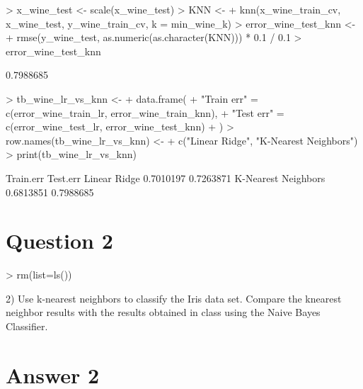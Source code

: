 \documentclass{article}
\begin{document}
\begin{Schunk}
\begin{Sinput}
> x_wine_test <- scale(x_wine_test)
> KNN <-
+   knn(x_wine_train_cv, x_wine_test, y_wine_train_cv, k = min_wine_k)
> error_wine_test_knn <-
+   rmse(y_wine_test, as.numeric(as.character(KNN))) * 0.1 / 0.1
> error_wine_test_knn 
\end{Sinput}
\begin{Soutput}
[1] 0.7988685
\end{Soutput}
\begin{Sinput}
> tb_wine_lr_vs_knn <-
+   data.frame(
+     "Train err" = c(error_wine_train_lr, error_wine_train_knn),
+     "Test err" = c(error_wine_test_lr, error_wine_test_knn)
+   )
> row.names(tb_wine_lr_vs_knn) <-
+   c("Linear Ridge", "K-Nearest Neighbors")
> print(tb_wine_lr_vs_knn)
\end{Sinput}
\begin{Soutput}
                    Train.err  Test.err
Linear Ridge        0.7010197 0.7263871
K-Nearest Neighbors 0.6813851 0.7988685
\end{Soutput}
\end{Schunk}

\section*{Question 2}

\begin{Schunk}
\begin{Sinput}
> rm(list=ls())
\end{Sinput}
\end{Schunk}

2) Use k-nearest neighbors to classify the Iris data set. 
Compare the knearest neighbor results with the results 
obtained in class using the Naive Bayes Classifier.

\section*{Answer  2}
\end{document}
